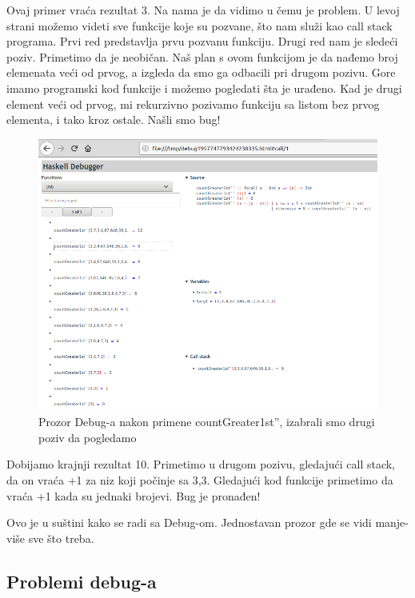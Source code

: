 \documentclass[a4paper]{article}
\begin{document}
{{Ovaj primer vraća rezultat 3. Na nama je da vidimo u čemu je problem. U levoj strani možemo videti sve funkcije koje su pozvane, što nam služi kao call stack programa. Prvi red predstavlja prvu pozvanu funkciju. Drugi red nam je sledeći poziv. Primetimo da je neobičan. Naš plan s ovom funkcijom je da nađemo broj elemenata veći od prvog, a izgleda da smo ga odbacili pri drugom pozivu.
Gore imamo programski kod funkcije i možemo pogledati šta je urađeno.
Kad je drugi element veći od prvog, mi rekurzivno pozivamo funkciju sa listom bez prvog elementa, i tako kroz ostale. Našli smo bug!

\begin{figure}[h!]
\begin{center}
\includegraphics[scale=0.3]{mitchell-browser-pregled''.png}
\caption{Prozor Debug-a nakon primene countGreater1st'', izabrali smo drugi poziv da pogledamo}
\end{center}
\end{figure}

Dobijamo krajnji rezultat 10. Primetimo u drugom pozivu, gledajući call stack, da on vraća +1 za niz koji počinje sa 3,3. Gledajući kod funkcije primetimo da vraća +1 kada su jednaki brojevi. Bug je pronađen!

Ovo je u suštini kako se radi sa Debug-om. Jednostavan prozor gde se vidi manje-više sve što treba.

\subsection{Problemi debug-a}

}}
\end{document}
